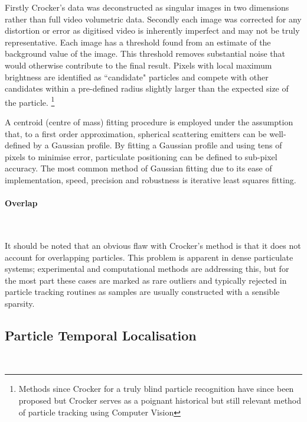 Firstly Crocker's data was deconstructed as singular images in two dimensions rather than full video volumetric data.
Secondly each image was corrected for any distortion or error as digitised video is inherently imperfect and may not be truly representative.
Each image has a threshold found from an estimate of the background value of the image.
This threshold removes substantial noise that would otherwise contribute to the final result.
Pixels with local maximum brightness are identified as ``candidate" particles and compete with other candidates within a pre-defined radius slightly larger than the expected size of the particle.
\footnote{Methods since Crocker for a truly blind particle recognition have since been proposed but Crocker serves as a poignant historical but still relevant method of particle tracking using Computer Vision}

A centroid (centre of mass) fitting procedure is employed under the assumption that, to a first order approximation, spherical scattering emitters can be well-defined by a Gaussian profile.
By fitting a Gaussian profile and using tens of pixels to minimise error, particulate positioning can be defined to sub-pixel accuracy.
The most common method of Gaussian fitting due to its ease of implementation, speed, precision and robustness is iterative least squares fitting.

\paragraph{Overlap}~

It should be noted that an obvious flaw with Crocker's method is that it does not account for overlapping particles.
This problem is apparent in dense particulate systems; experimental and computational methods are addressing this\cite{Serge2008}, but for the most part these cases are marked as rare outliers and typically rejected in particle tracking routines as samples are usually constructed with a sensible sparsity.


\subsection{Particle Temporal Localisation}~


